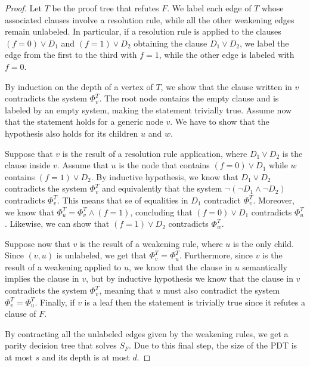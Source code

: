 \begin{proof}
 Let $T$ be the proof tree that refutes $F$. We label each edge of $T$ whose associated clauses involve a resolution rule, while all the other weakening edges remain unlabeled. In particular, if a resolution rule is applied to the clauses $(f = 0) \lor D_1$ and $(f = 1) \lor D_2$ obtaining the clause $D_1 \lor D_2$, we label the edge from the first to the third with $f = 1$, while the other edge is labeled with $f = 0$.

 By induction on the depth of a vertex of $T$, we show that the clause written in $v$ contradicts the system $\Phi_v^T$. The root node contains the empty clause and is labeled by an empty system, making the statement trivially true. Assume now that the statement holds for a generic node $v$. We have to show that the hypothesis also holds for its children $u$ and $w$.

 Suppose that $v$ is the result of a resolution rule application, where $D_1 \lor D_2$ is the clause inside $v$. Assume that $u$ is the node that contains $(f = 0) \lor D_1$ while $w$ contains $(f = 1) \lor D_2$. By inductive hypothesis, we know that $D_1 \lor D_2$ contradicts the system $\Phi_v^T$ and equivalently that the system $\lnot (\lnot D_1 \land \lnot D_2)$ contradicts $\Phi_v^T$. This means that se of equalities in $D_1$ contradict $\Phi_v^T$. Moreover, we know that $\Phi_u^T = \Phi_v^T \land (f = 1)$, concluding that $(f = 0) \lor D_1$ contradicts $\Phi_u^T$. Likewise, we can show that $(f = 1) \lor D_2$ contradicts $\Phi_w^T$.
    
 Suppose now that $v$ is the result of a weakening rule, where $u$ is the only child. Since $(v,u)$ is unlabeled, we get that $\Phi_v^T = \Phi_u^T$. Furthermore, since $v$ is the result of a weakening applied to $u$, we know that the clause in $u$ semantically implies the clause in $v$, but by inductive hypothesis we know that the clause in $v$ contradicts the system $\Phi_v^T$, meaning that $u$ must also contradict the system $\Phi_v^T = \Phi_u^T$. Finally, if $v$ is a leaf then the statement is trivially true since it refutes a clause of $F$.

 By contracting all the unlabeled edges given by the weakening rules, we get a parity decision tree that solves $S_F$. Due to this final step, the size of the PDT is at most $s$ and its depth is at most $d$. 
\end{proof}

